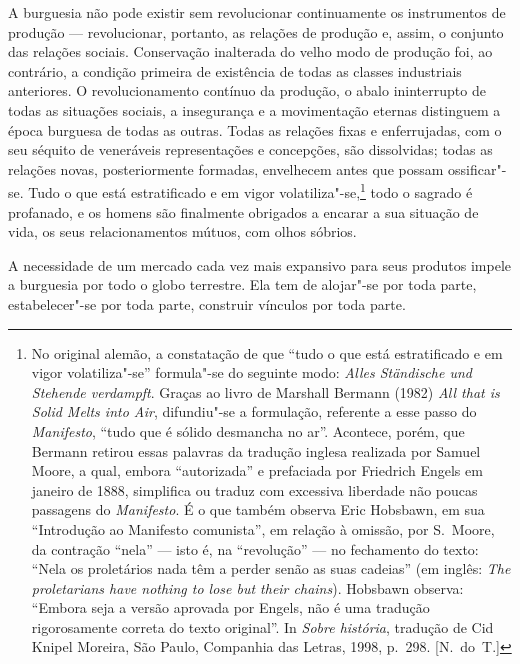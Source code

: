 A burguesia não pode existir sem revolucionar continuamente os
instrumentos de produção  ---  revolucionar, portanto, as relações de
produção e, assim, o conjunto das relações sociais. Conservação
inalterada do velho modo de produção foi, ao contrário, a condição
primeira de existência de todas as classes industriais anteriores. O
revolucionamento contínuo da produção, o abalo ininterrupto de todas as
situações sociais, a insegurança e a movimentação eternas distinguem a
época burguesa de todas as outras. Todas as relações fixas e
enferrujadas, com o seu séquito de veneráveis representações e
concepções, são dissolvidas; todas as relações novas, posteriormente
formadas, envelhecem antes que possam ossificar"-se. Tudo o que está
estratificado e em vigor
volatiliza"-se,\footnote{ No original alemão, a constatação de que      \label{2}
``tudo o que está estratificado e em vigor volatiliza"-se'' formula"-se		
do seguinte modo: \textit{Alles Ständische und Stehende verdampft}.
Graças ao livro de Marshall Bermann (1982) \textit{All that is Solid
Melts into Air}, difundiu"-se a formulação, referente a esse passo do
\textit{Manifesto}, ``tudo que é sólido desmancha no ar''. Acontece,
porém, que Bermann retirou essas palavras da tradução inglesa realizada
por Samuel Moore, a qual, embora “autorizada” e prefaciada por
Friedrich Engels em janeiro de 1888, simplifica ou traduz com excessiva
liberdade não poucas passagens do \textit{Manifesto}. É o que
também observa Eric Hobsbawn, em sua ``Introdução ao Manifesto
comunista'', em relação à omissão, por S.~Moore, da contração ``nela''  --- 
isto é, na ``revolução''  ---  no fechamento do texto: ``Nela os proletários
nada têm a perder senão as suas cadeias'' (em inglês: \textit{The
proletarians have nothing to lose but their chains}). Hobsbawn observa:
``Embora seja a versão aprovada por Engels, não é uma tradução
rigorosamente correta do texto original''. In \textit{Sobre história},
tradução de Cid Knipel Moreira, São Paulo, Companhia das Letras, 1998,
p.~298. [N.~do~T.]} todo o sagrado é profanado, e os homens são finalmente
obrigados a encarar a sua situação de vida, os seus relacionamentos mútuos,
com olhos sóbrios.

A necessidade de um mercado cada vez mais expansivo para seus produtos
impele a burguesia por todo o globo terrestre. Ela tem de alojar"-se
por toda parte, estabelecer"-se por toda parte, construir vínculos por
toda parte.

